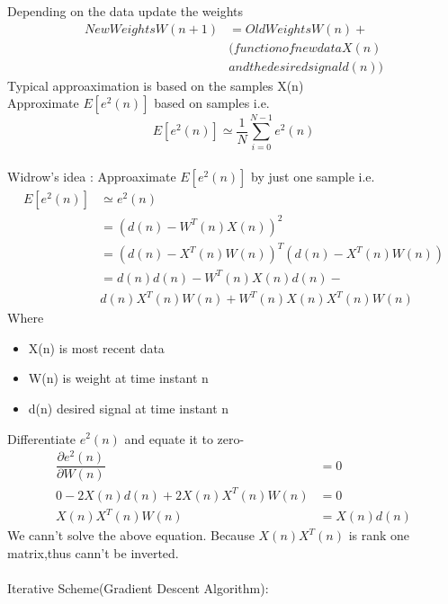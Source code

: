 \documentclass[journal,12pt,twocolumn]{IEEEtran}
\begin{document}
Depending on the data update the weights 
\begin{align*}
New Weights W(n+1)&=Old Weights W(n) + \\ &(function of new data X(n) \\ &and the desired signal d(n))
\end{align*}
Typical approaximation is based on the samples X(n)\\
Approximate $E[e^{2}(n)]$ based on samples i.e.\\
$$E[e^{2}(n)] \simeq \dfrac{1}{N}\sum_{i=0}^{N-1} e^{2}(n)$$
\\
Widrow's idea : Approaximate $E[e^{2}(n)]$ by just one sample i.e.\\
\begin{align*}
E[e^{2}(n)]&\simeq e^{2}(n)\\
&=(d(n) - W^{T}(n) X(n))^{2}\\
&=(d(n) - X^{T}(n)W(n))^{T}(d(n) - X^{T}(n)W(n))\\
&=d(n)d(n) - W^{T}(n)X(n)d(n)-\\ &d(n)X^{T}(n)W(n)+W^{T}(n)X(n)X^{T}(n)W(n)
\end{align*}
Where
\begin{itemize}
\item X(n) is most recent data
\item W(n) is weight at time instant n
\item d(n) desired signal at time instant n\\
\end{itemize}
Differentiate $e^{2}(n)$ and equate it to zero-
\begin{align*}
\dfrac{\partial e^{2}(n)}{\partial W(n)}&=0\\
0 - 2X(n)d(n) + 2 X(n) X^{T}(n)W(n)&=0\\
X(n) X^{T}(n)W(n)&=X(n)d(n)
\end{align*}
We cann't solve the above equation. Because $X(n) X^{T}(n)$ is rank one matrix,thus cann't be inverted.\\ \\
Iterative Scheme(Gradient Descent Algorithm):\\
\end{document}
